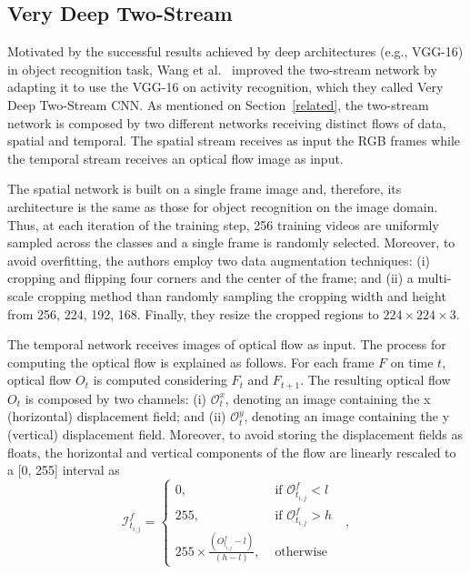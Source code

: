 \documentclass[10pt,conference]{IEEEtran}
\begin{document}
\subsection{Very Deep Two-Stream}

Motivated by the successful results achieved by deep architectures (e.g., VGG-16) in object recognition task, Wang et al.~\cite{Wang:2015} improved the two-stream network by adapting it to use the VGG-16 on activity recognition, which they called Very Deep Two-Stream CNN. As mentioned on Section~\ref{related}, the two-stream network is composed by two different networks receiving distinct flows of data, spatial and temporal. The spatial stream receives as input the RGB frames while the temporal stream receives an optical flow image as input.

The spatial network is built on a single frame image and, therefore, its architecture is the same as those for object recognition on the image domain. Thus, at each iteration of the training step, 256 training videos are uniformly sampled across the classes and a single frame is randomly selected. Moreover,  to avoid overfitting, the authors employ two data augmentation techniques: (i) cropping and flipping four corners and the center of the frame; and (ii) a multi-scale cropping method than randomly sampling the cropping width and height from {256, 224, 192, 168}. Finally, they resize the cropped regions to $224\times224\times3$.

The temporal network receives images of optical flow as input. The process for computing the optical flow is explained  as follows. For each frame $F$ on time $t$, optical flow $O_{t}$ is computed considering $F_{t}$ and $F_{t+1}$. The resulting optical flow $O_{t}$ is composed by two channels: (i) ${\mathcal O^{x}_{t}}$, denoting an image containing the x (horizontal) displacement field; and (ii) ${\mathcal O^{y}_{t}}$, denoting an image containing the y (vertical) displacement  field. Moreover, to avoid storing the displacement fields as floats, the horizontal and vertical components of the flow are linearly rescaled to a [0, 255] interval as
\begin{equation}\label{eq:linearflow}
	\mathcal I^{f}_{t_{i,j}} = \left\{
	\begin{array}{rl}
		0, &\mbox{ if $\mathcal O^{f}_{t_{i,j}} < l$} \\
		255, &\mbox{  if $\mathcal O^{f}_{t_{i,j}} > h$ } \\
		255 \times \frac{(O^{f}_{t_{i,j}} - l)}{(h - l)}, &\mbox{ otherwise }
	\end{array} \right.,
\end{equation}
\end{document}
